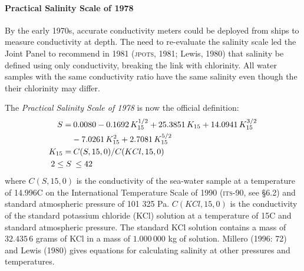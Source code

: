 \paragraph{Practical Salinity Scale of 1978}
By the early 1970s, accurate conductivity meters could be deployed
from ships to measure conductivity at depth. The need to re-evaluate
the salinity scale led the Joint Panel to recommend in 1981
(\textsc{jpots}, 1981; Lewis, 1980) that salinity be defined using
only conductivity, breaking the link with chlorinity. All water
samples with the same conductivity ratio have the same salinity even
though the their chlorinity may differ.

The \textit{Practical Salinity Scale of 1978} is now the official definition:
\begin{subequations}
\begin{align}
S       = &\:0.0080  -0.1692\,K^{1/2}_{15} + 25.3851\,K_{15} + 14.0941\,K^{3/2}_{15} \notag \\
          &- 7.0261\,K^{2}_{15} + 2.7081\,K^{5/2}_{15} \\
K_{15}  = &\:C(S,15,0)/C(KCl,15,0) \\
2 \leq S &\:\leq 42 \notag
\end{align}
\end{subequations}
where $C(S, 15, 0)$ is the conductivity of the sea-water sample at a
temperature of 14.996\degrees C on the International Temperature Scale
of 1990 (\textsc{its}-90, see \S 6.2) and standard atmospheric
pressure of 101 325 Pa.
$C(KCl, 15, 0)$ is the conductivity of the standard potassium chloride (KCl)
solution at a temperature of 15\degrees C and standard atmospheric
pressure. The standard KCl solution contains a mass of $32.435\,6$
grams of KCl in a mass of $1.000\,000$ kg of solution. Millero (1996:
72) and Lewis (1980) gives equations for calculating salinity at other
pressures and temperatures.

